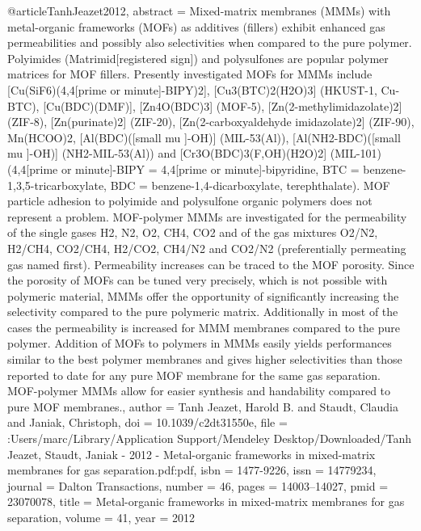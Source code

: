 @article{TanhJeazet2012,
abstract = {Mixed-matrix membranes (MMMs) with metal-organic frameworks (MOFs) as additives (fillers) exhibit enhanced gas permeabilities and possibly also selectivities when compared to the pure polymer. Polyimides (Matrimid[registered sign]) and polysulfones are popular polymer matrices for MOF fillers. Presently investigated MOFs for MMMs include [Cu(SiF6)(4,4[prime or minute]-BIPY)2], [Cu3(BTC)2(H2O)3] (HKUST-1, Cu-BTC), [Cu(BDC)(DMF)], [Zn4O(BDC)3] (MOF-5), [Zn(2-methylimidazolate)2] (ZIF-8), [Zn(purinate)2] (ZIF-20), [Zn(2-carboxyaldehyde imidazolate)2] (ZIF-90), Mn(HCOO)2, [Al(BDC)([small mu ]-OH)] (MIL-53(Al)), [Al(NH2-BDC)([small mu ]-OH)] (NH2-MIL-53(Al)) and [Cr3O(BDC)3(F,OH)(H2O)2] (MIL-101) (4,4[prime or minute]-BIPY = 4,4[prime or minute]-bipyridine, BTC = benzene-1,3,5-tricarboxylate, BDC = benzene-1,4-dicarboxylate, terephthalate). MOF particle adhesion to polyimide and polysulfone organic polymers does not represent a problem. MOF-polymer MMMs are investigated for the permeability of the single gases H2, N2, O2, CH4, CO2 and of the gas mixtures O2/N2, H2/CH4, CO2/CH4, H2/CO2, CH4/N2 and CO2/N2 (preferentially permeating gas named first). Permeability increases can be traced to the MOF porosity. Since the porosity of MOFs can be tuned very precisely, which is not possible with polymeric material, MMMs offer the opportunity of significantly increasing the selectivity compared to the pure polymeric matrix. Additionally in most of the cases the permeability is increased for MMM membranes compared to the pure polymer. Addition of MOFs to polymers in MMMs easily yields performances similar to the best polymer membranes and gives higher selectivities than those reported to date for any pure MOF membrane for the same gas separation. MOF-polymer MMMs allow for easier synthesis and handability compared to pure MOF membranes.},
author = {{Tanh Jeazet}, Harold B. and Staudt, Claudia and Janiak, Christoph},
doi = {10.1039/c2dt31550e},
file = {:Users/marc/Library/Application Support/Mendeley Desktop/Downloaded/Tanh Jeazet, Staudt, Janiak - 2012 - Metal-organic frameworks in mixed-matrix membranes for gas separation.pdf:pdf},
isbn = {1477-9226},
issn = {14779234},
journal = {Dalton Transactions},
number = {46},
pages = {14003--14027},
pmid = {23070078},
title = {{Metal-organic frameworks in mixed-matrix membranes for gas separation}},
volume = {41},
year = {2012}
}
